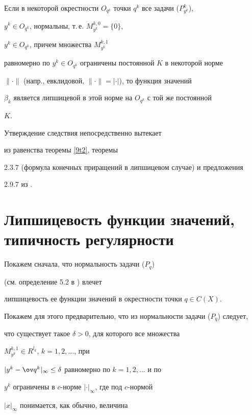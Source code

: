 \begin{cors}\label{9c1}


Если в некоторой окрестности $O_{q^k}$ точки $q^k$ все задачи ($P_{y^k}^k$),


$y^k\in O_{q^k}$, нормальны, т.\,е. ${M_{y^k}^{k,0}}=\{0\}$,


$y^k\in O_{q^k}$, причем множества ${M_{y^k}^{k,1}}$


равномерно по $y^k\in O_{q^k}$ ограничены постоянной $K$ в некоторой норме


$\|\cdot\|$ (напр., евклидовой, $\|\cdot\|=|\cdot|$), то функция значений


$\beta_k$ является липшицевой в этой норме на $O_{q^k}$ с той же постоянной


$K$.


\end{cors}





Утверждение следствия непосредственно вытекает


из равенства теоремы \ref{9t2}, теоремы


2.3.7 (формула конечных приращений в липшицевом случае) и предложения


2.9.7 из \cite{clarke}.





\section{Липшицевость функции значений, типичность регулярности}





Покажем сначала, что нормальность задачи ($P_q$)


(см. определение 5.2 в \cite{sumin98}) влечет


липшицевость ее функции значений в окрестности точки $q\in C(X)$.


Покажем для этого предварительно, что из нормальности задачи ($P_q$) следует,


что существует такое $\delta>0$, для которого все множества


${M_{y^k}^{k,1}}\in R^{l_k}$, $k=1,2,\dotsc$, при


$|y^k-\ov q^k|_\infty\leq \delta$ равномерно по $k=1,2,\dotsc$ и по


$y^k$ ограничены в $c$-норме $|\cdot|_\infty$, где под $c$-нормой


$|x|_\infty$ понимается, как обычно, величина


